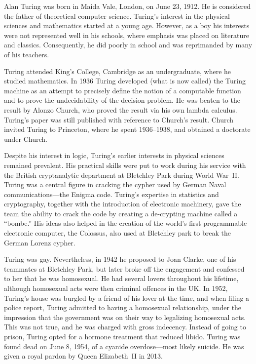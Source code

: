 \documentclass[../../../include/open-logic-section]{subfiles}
\begin{document}

Alan Turing was born in Maida Vale, London, on June 23, 1912. He is
considered the father of theoretical computer science. Turing's
interest in the physical sciences and mathematics started at a young
age. However, as a boy his interests were not represented well in his
schools, where emphasis was placed on literature and
classics. Consequently, he did poorly in school and was reprimanded by
many of his teachers.


Turing attended King's College, Cambridge as an undergraduate, where
he studied mathematics. In 1936 Turing developed (what is now called)
the Turing machine as an attempt to precisely define the notion of a
computable function and to prove the undecidability of the decision
problem. He was beaten to the result by Alonzo Church, who proved the
result via his own lambda calculus. Turing's paper was still published
with reference to Church's result. Church invited Turing to Princeton,
where he spent 1936--1938, and obtained a doctorate under Church.

Despite his interest in logic, Turing's earlier interests in physical
sciences remained prevalent. His practical skills were put to work
during his service with the British cryptanalytic department at
Bletchley Park during World War~II. Turing was a central figure in
cracking the cypher used by German Naval communications---the Enigma
code.  Turing's expertise in statistics and cryptography, together
with the introduction of electronic machinery, gave the team the
ability to crack the code by creating a de-crypting machine called a
``bombe.'' His ideas also helped in the creation of the world's first
programmable electronic computer, the Colossus, also used at Bletchley
park to break the German Lorenz cypher.

Turing was gay. Nevertheless, in 1942 he proposed to Joan Clarke, one
of his teammates at Bletchley Park, but later broke off the engagement
and confessed to her that he was homosexual. He had several lovers
throughout his lifetime, although homosexual acts were then criminal
offences in the UK. In 1952, Turing's house was burgled by a friend of
his lover at the time, and when filing a police report, Turing
admitted to having a homosexual relationship, under the impression
that the government was on their way to legalizing homosexual
acts. This was not true, and he was charged with gross
indecency. Instead of going to prison, Turing opted for a hormone
treatment that reduced libido.  Turing was found dead on June 8, 1954,
of a cyanide overdose---most likely suicide. He was given a royal
pardon by Queen Elizabeth~II in 2013.
\end{document}
